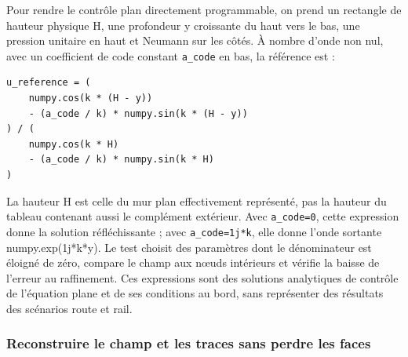 \documentclass[11pt,a4paper]{article}
\begin{document}
Pour rendre le contrôle plan directement programmable, on prend un rectangle de hauteur physique {\small\ttfamily H}, une profondeur {\small\ttfamily y} croissante du haut vers le bas, une pression unitaire en haut et Neumann sur les côtés. À nombre d'onde non nul, avec un coefficient de code constant {\small\ttfamily \nolinkurl{a_code}} en bas, la référence est :

\begin{Verbatim}[breaklines,breakanywhere,fontsize=\footnotesize]
u_reference = (
    numpy.cos(k * (H - y))
    - (a_code / k) * numpy.sin(k * (H - y))
) / (
    numpy.cos(k * H)
    - (a_code / k) * numpy.sin(k * H)
)
\end{Verbatim}

La hauteur {\small\ttfamily H} est celle du mur plan effectivement représenté, pas la hauteur du tableau contenant aussi le complément extérieur. Avec {\small\ttfamily \nolinkurl{a_code=0}}, cette expression donne la solution réfléchissante ; avec {\small\ttfamily \nolinkurl{a_code=1j*k}}, elle donne l'onde sortante {\small\ttfamily numpy.exp(1j*k*y)}. Le test choisit des paramètres dont le dénominateur est éloigné de zéro, compare le champ aux nœuds intérieurs et vérifie la baisse de l'erreur au raffinement. Ces expressions sont des solutions analytiques de contrôle de l'équation plane et de ses conditions au bord, sans représenter des résultats des scénarios route et rail.

\subsubsection{Reconstruire le champ et les traces sans perdre les faces}
\end{document}
